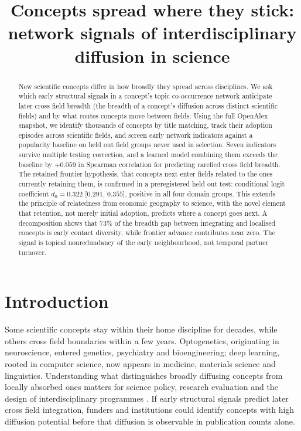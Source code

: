 \documentclass[11pt,letterpaper]{article}
\title{Concepts spread where they stick: network signals of interdisciplinary diffusion in science}
\author{}
\date{}
\begin{document}
\maketitle

\begin{abstract}
New scientific concepts differ in how broadly they spread across disciplines.
We ask which early structural signals in a concept's topic co-occurrence network
anticipate later cross field breadth (the breadth of a concept's diffusion
across distinct scientific fields) and by what routes concepts move between
fields. Using the full OpenAlex snapshot, we identify thousands of concepts by
title matching, track their adoption episodes across scientific fields, and
screen early network indicators against a popularity baseline on held out field
groups never used in selection. Seven indicators survive multiple testing
correction, and a learned model combining them exceeds the baseline by
$+0.059$ in Spearman correlation for predicting rarefied cross field breadth.
The retained frontier hypothesis, that concepts next enter fields related to the
ones currently retaining them, is confirmed in a preregistered held out test:
conditional logit coefficient $d_0 = 0.322$ [$0.291$, $0.355$], positive in all
four domain groups. This extends the principle of
relatedness from economic geography to science, with the novel element that
retention, not merely initial adoption, predicts where a concept goes next.
A decomposition shows that 73\% of the breadth gap between integrating and
localised concepts is early contact diversity, while frontier advance
contributes near zero. The signal is topical nonredundancy of the early
neighbourhood, not temporal partner turnover.
\end{abstract}

\section{Introduction}
\label{sec:introduction}

Some scientific concepts stay within their home discipline for decades, while
others cross field boundaries within a few years. Optogenetics, originating in
neuroscience, entered genetics, psychiatry and bioengineering; deep learning,
rooted in computer science, now appears in medicine, materials science and
linguistics. Understanding what distinguishes broadly diffusing concepts from
locally absorbed ones matters for science policy, research evaluation and the
design of interdisciplinary programmes \citep{Cheng2023, Hofstra2019}. If early
structural signals predict later cross field integration, funders and
institutions could identify concepts with high diffusion potential before that
diffusion is observable in publication counts alone.
\end{document}
